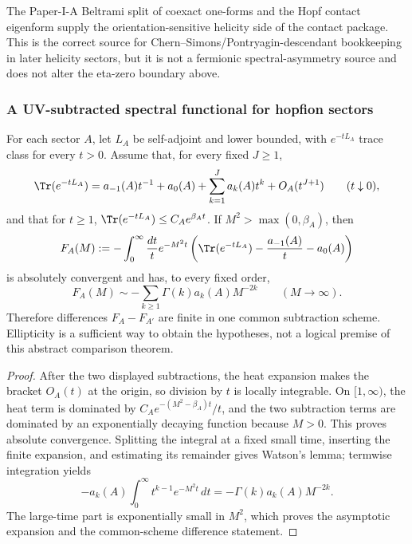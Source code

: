 \documentclass[11pt,a4paper]{article}
\begin{document}
\begin{remark}
\label{p3:rem:beltrami-helicity-orientation-data}
The Paper-I-A Beltrami split of coexact one-forms and the Hopf contact eigenform
supply the orientation-sensitive helicity side of the contact package.  This is
the correct source for Chern--Simons/Pontryagin-descendant bookkeeping in later
helicity sectors, but it is not a fermionic spectral-asymmetry source and does
not alter the eta-zero boundary above.
\end{remark}

\subsubsection{A UV-subtracted spectral functional for hopfion sectors}

\begin{theorem}
\label{p3b:thm:abstract-hopfion-comparison}
For each sector \(A\), let \(L_A\) be self-adjoint and lower bounded, with
\(e^{-tL_A}\) trace class for every \(t>0\).  Assume that, for every fixed
\(J\ge1\),
\[
 \Tr(e^{-tL_A})
 =a_{-1}(A)t^{-1}+a_0(A)
  +\sum_{k=1}^{J}a_k(A)t^k+O_A(t^{J+1})
 \qquad(t\downarrow0),
\]
and that for \(t\ge1\),
\(\Tr(e^{-tL_A})\le C_Ae^{\beta_A t}\).  If
\(M^2>\max(0,\beta_A)\), then
\[
 F_A(M):=-\int_0^\infty\frac{dt}{t}e^{-M^2t}
 \left(\Tr(e^{-tL_A})-\frac{a_{-1}(A)}t-a_0(A)\right)
\]
is absolutely convergent and has, to every fixed order,
\[
 F_A(M)
 \sim-\sum_{k\ge1}\Gamma(k)a_k(A)M^{-2k}
 \qquad(M\to\infty).
\]
Therefore differences \(F_A-F_{A'}\) are finite in one common subtraction
scheme.  Ellipticity is a sufficient way to obtain the hypotheses, not a
logical premise of this abstract comparison theorem.
\end{theorem}

\begin{proof}
After the two displayed subtractions, the heat expansion makes the bracket
\(O_A(t)\) at the origin, so division by \(t\) is locally integrable.  On
\([1,\infty)\), the heat term is dominated by
\(C_Ae^{-(M^2-\beta_A)t}/t\), and the two subtraction terms are dominated by
an exponentially decaying function because \(M>0\).  This proves absolute
convergence.  Splitting the integral at a fixed small time, inserting the
finite expansion, and estimating its remainder gives Watson's lemma; termwise
integration yields
\[
 -a_k(A)\int_0^\infty t^{k-1}e^{-M^2t}\,dt
 =-\Gamma(k)a_k(A)M^{-2k}.
\]
The large-time part is exponentially small in \(M^2\), which proves the
asymptotic expansion and the common-scheme difference statement.
\end{proof}
\end{document}
